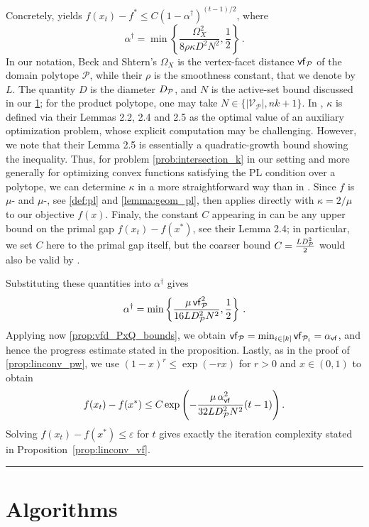 \documentclass[twoside]{article}
\newcommand{\jmlrBlackBox}{\rule{1.5ex}{1.5ex}}
\newcommand{\jmlrQED}{\hfill\jmlrBlackBox\par\bigskip}
\providecommand{\proofname}{Proof}
\renewenvironment{proof}{\par\noindent{\bfseries\upshape \proofname\ }}{\jmlrQED}
\newcommand{\mP}{\mathcal{P}}
\newcommand{\verts}[1]{\mathcal{V}_{#1}}
\let\epsilon\varepsilon
\begin{document}
\begin{proof}
{Concretely, {\citep[Theorem 3.1]{BS15}} yields $f(x_t)-f^\ast \le C\left(1-\alpha^\dagger\right)^{(t-1)/2}$, where
\[
\alpha^\dagger = \min\left\{\frac{\Omega_X^2}{8\rho\kappa D^2N^2},\frac{1}{2}\right\}\,.
\]
In our notation, Beck and Shtern's $\Omega_X$ is the vertex-facet distance $\vf{\mP}$ of the domain polytope $\mP$, while their $\rho$ is the smoothness constant, that we denote by $L$.
The quantity $D$ is the diameter $\diam{\mP}$, and $N$ is the active-set bound discussed in our \cref{a:algos}; for the product polytope, one may take $N \in \{|\verts{\mP}|, nk+1\}$.
In \citep{BS15}, $\kappa$ is defined via their Lemmas 2.2, 2.4 and 2.5 as the optimal value of an auxiliary optimization problem, whose explicit computation may be challenging.
However, we note that their Lemma 2.5 is essentially a quadratic-growth bound showing the \QG{} inequality.
Thus, for problem \eqref{prob:intersection_k} in our setting and more generally for optimizing convex functions satisfying the PL condition over a polytope, we can determine $\kappa$ in a more straightforward way than in \citep{BS15}.
Since $f$ is $\mu$-\PL{} and $\mu$-\QG{}, see \cref{def:pl} and \cref{lemma:geom_pl}, then {\citep[Lemma 2.5]{BS15}} applies directly with $\kappa = 2/\mu$ to our objective $f(x)$.
Finaly, the constant $C$ appearing in {\citep[Theorem 3.1]{BS15}} can be any upper bound on the primal gap $f(x_t) - f(x^\ast)$, see their Lemma 2.4; in particular, we set $C$ here to the primal gap itself, but the coarser bound $C = \frac{L\diam[2]{\mP}}{2}$ would also be valid by {\citep[Theorem 2.2]{BCC+23}}.

Substituting these quantities into $\alpha^\dagger$ gives
\[
\alpha^\dagger
=
\min\left\{
\frac{\mu\,\vf[2]{\mP}}{16L\diam[2]{\mP}N^2},
\frac{1}{2}
\right\}\,.
\]
Applying now \cref{prop:vfd_PxQ_bounds}, we obtain $\vf{\mP} = \min_{i\in[k]}\vf{\mP_i} = \alpha_{\vf{}}$, and hence the progress estimate stated in the proposition.
Lastly, as in the proof of \cref{prop:linconv_pw}, we use $(1-x)^r \le \exp(-rx)$ for $r>0$ and $x\in(0,1)$ to obtain
\[
f(x_t)-f(x^\ast)
\le
C\exp\left(
-\frac{\mu\,\alpha_{\vf{}}^2}{32L\diam[2]{\mP}N^2}(t-1)
\right).
\]
Solving $f(x_t)-f(x^\ast)\le \epsilon$ for $t$ gives exactly the iteration complexity stated in Proposition~\ref{prop:linconv_vf}.
}
\end{proof}



\section{Algorithms}\label{a:algos}
\end{document}
